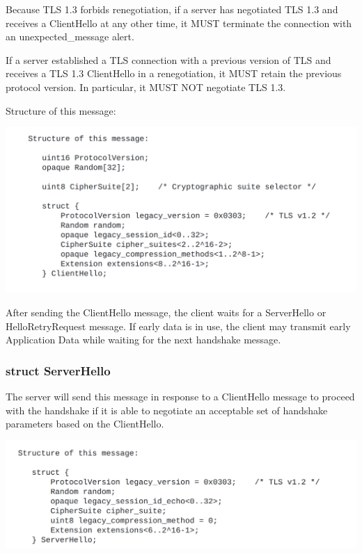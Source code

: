 \documentclass{article}
\begin{document}
Because TLS 1.3 forbids renegotiation, if a server has negotiated
   TLS 1.3 and receives a ClientHello at any other time, it MUST
   terminate the connection with an unexpected\_message alert.

   If a server established a TLS connection with a previous version of
   TLS and receives a TLS 1.3 ClientHello in a renegotiation, it MUST
   retain the previous protocol version.  In particular, it MUST NOT
   negotiate TLS 1.3.

     Structure of this message:

\begin{center}
       \includegraphics[width=1.1\columnwidth]{media/ClientHello.png}
\end{center}


     After sending the ClientHello message, the client waits for a
   ServerHello or HelloRetryRequest message.  If early data is in use,
   the client may transmit early Application Data while
   waiting for the next handshake message.


\subsubsection{struct ServerHello}
The server will send this message in response to a ClientHello
   message to proceed with the handshake if it is able to negotiate an
   acceptable set of handshake parameters based on the ClientHello.
\begin{center}
       \includegraphics[width=1.1\columnwidth]{media/ServerHello.png}
\end{center}
\end{document}
